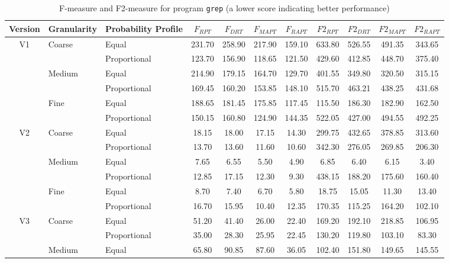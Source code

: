 \documentclass[10pt,journal,compsoc]{IEEEtran}
\begin{document}
\begin{table*}
\caption{F-measure and F2-measure for program \texttt{grep} (a lower score indicating better performance)}
\label{tab:Fgrep}
\centering
\begin{tabular}{|c|l|l|c|c|c|c|c|c|c|c|} \hline
Version	& Granularity	& Probability Profile	& $F_{RPT}$	& $F_{DRT}$	& $F_{MAPT}$	& $F_{RAPT}$	& $F2_{RPT}$	& $F2_{DRT}$	& $F2_{MAPT}$	 & $F2_{RAPT}$	\\ \hline
V1	& Coarse	& Equal					& 231.70	& 258.90	& 217.90	& 159.10	& 633.80	& 526.55	& 491.35	& 343.65	\\ \cline{3-11}
		&					& Proportional	& 123.70	& 156.90	& 118.65	& 121.50	& 429.60	& 412.85	& 448.70	& 375.40	\\ \cline{2-11}
		& Medium	& Equal					& 214.90	& 179.15	& 164.70	& 129.70	& 401.55	& 349.80	& 320.50	& 315.15	\\ \cline{3-11}
		&					& Proportional	& 169.45	& 160.20	& 153.85	& 148.10	& 515.70	& 463.21	& 438.25	& 431.68	\\ \cline{2-11}
		& Fine		& Equal					& 188.65	& 181.45	& 175.85	& 117.45	& 115.50	& 186.30	& 182.90	& 162.50	\\ \cline{3-11}
		&					& Proportional	& 150.15	& 160.80	& 124.90	& 144.35	& 522.05	& 427.00	& 494.55	& 492.25	\\ \hline
V2	& Coarse	& Equal					& 18.15		& 18.00		& 17.15		& 14.30		& 299.75	& 432.65	& 378.85	& 313.60	\\ \cline{3-11}
		&					& Proportional	& 13.70		& 13.60		& 11.60		& 10.60		& 342.30	& 276.05	& 269.85	& 206.30	\\ \cline{2-11}
		& Medium	& Equal					& 7.65		& 6.55		& 5.50		& 4.90		& 6.85		& 6.40		& 6.15		& 3.40		\\ \cline{3-11}
		&					& Proportional	& 12.85		& 17.15		& 12.30		& 9.30		& 438.15	& 188.20	& 175.60	& 160.40	\\ \cline{2-11}
		& Fine		& Equal					& 8.70		& 7.40		& 6.70		& 5.80		& 18.75		& 15.05		& 11.30		& 13.40		\\ \cline{3-11}
		&					& Proportional	& 16.70		& 15.95		& 10.40		& 12.35		& 170.35	& 115.25	& 164.20	& 102.10	\\ \hline
V3	& Coarse	& Equal					& 51.20	& 41.40	& 26.00	& 22.40	& 169.20	& 192.10	& 218.85	& 106.95	\\ \cline{3-11}
		&					& Proportional	& 35.00	& 28.30	& 25.95	& 22.45	& 130.20	& 119.80	& 103.10	& 83.30		\\ \cline{2-11}
		& Medium	& Equal					& 65.80	& 90.85	& 87.60	& 36.05	& 102.40	& 151.80	& 149.65	& 145.55	\\ \cline{3-11}

\end{tabular}
\end{table*}
\end{document}
